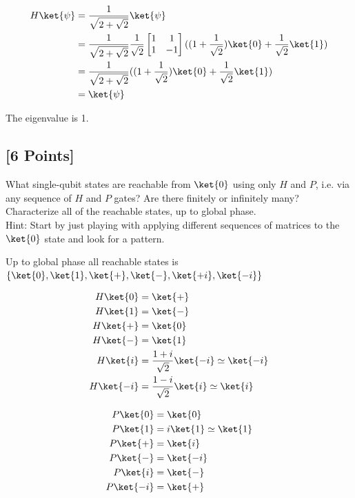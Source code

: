 \documentclass[11pt]{article}
\begin{document}
\begin{solution}
    \begin{align*}
        H \ket{\psi} &= \frac{1}{\sqrt{2 + \sqrt{2}}} \ket{\psi} \\
        &= \frac{1}{\sqrt{2 + \sqrt{2}}} \frac{1}{\sqrt{2}} \begin{bmatrix}
            1 & 1 \\ 1 & -1
        \end{bmatrix} ((1 + \frac{1}{ \sqrt{2}}) \ket{0} + \frac{1}{\sqrt{2}} \ket{1}) \\
        &= \frac{1}{\sqrt{2 + \sqrt{2}}} ((1 + \frac{1}{\sqrt{2}}) \ket{0} + \frac{1}{\sqrt{2}} \ket{1}) \\
        &= \ket{\psi}
    \end{align*}

    The eigenvalue is 1. 
\end{solution}

\subsection{[6 Points]} What single-qubit states are reachable from $\ket{0}$ using only $H$ and $P$, i.e. via any sequence of $H$ and $P$ gates? Are there finitely or infinitely many? Characterize all of the reachable states, up to global phase.
\\ Hint: Start by just playing with applying different sequences of matrices to the $\ket{0}$ state and look for a pattern.

\begin{solution}
    Up to global phase all reachable states is $
    \left\{ \ket{0}, \ket{1}, \ket{+}, \ket{-}, \ket{+i}, \ket{-i} \right\}$ 

    \begin{align*}
        H \ket{0} &= \ket{+} \\
        H \ket{1} &= \ket{-} \\
        H \ket{+} &= \ket{0} \\
        H \ket{-} &= \ket{1} \\
        H \ket{i} &= \frac{1 + i}{\sqrt{2}} \ket{-i} \simeq \ket{-i} \\
        H \ket{-i} &= \frac{1 - i}{\sqrt{2}} \ket{i} \simeq \ket{i}\\
    \end{align*} 
    
    \begin{align*}
        P \ket{0} &= \ket{0} \\
        P \ket{1} &= i\ket{1} \simeq \ket{1}\\
        P \ket{+} &= \ket{i} \\
        P \ket{-} &= \ket{-i} \\
        P \ket{i} &= \ket{-} \\
        P \ket{-i} &= \ket{+} \\
    \end{align*}
\end{solution}
\end{document}
